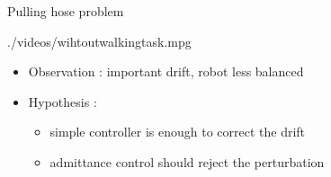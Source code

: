 \begin{frame}{Pulling hose problem}
  \vspace*{-0.5cm}
  \begin{center}
    {./videos/wihtoutwalkingtask.mpg}
  \end{center} 
  \begin{itemize}
    \item Observation : important drift, robot less balanced
    \item Hypothesis :
    \begin{itemize}
      \item simple controller is enough to correct the drift
      \item admittance control should reject the perturbation 
    \end{itemize}
  \end{itemize}
\end{frame} 
 
